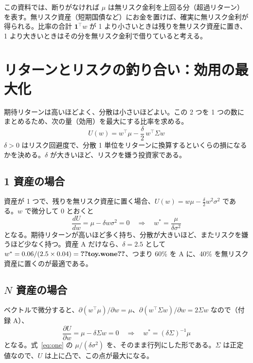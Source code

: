 \documentclass[xelatex,ja=standard,jafont=hiragino-pron,a4paper,11pt,openany]{bxjsreport}
\makeatletter
\newcommand{\V}[1]{\ifcsname v@#1\endcsname\csname v@#1\endcsname\else\textbf{??#1??}\fi}
\newcommand{\tabin}[1]{\adjustbox{max width=\linewidth}{}}
\newcommand{\T}{^{\top}}
\newcommand{\one}{\mathbf{1}}
\makeatother
\begin{document}
\begin{table}[htbp]
\centering
\caption{2 資産を半分ずつ持つポートフォリオの、相関とリスク。}
\label{tab:toyrho}
\small\tabin{toy_rho}
\end{table}

この資料では、断りがなければ $\mu$ は無リスク金利を上回る分（超過リターン）を表す。無リスク資産（短期国債など）にお金を置けば、確実に無リスク金利が得られる。比率の合計 $\one\T w$ が 1 より小さいときは残りを無リスク資産に置き、1 より大きいときはその分を無リスク金利で借りていると考える。

\section{リターンとリスクの釣り合い：効用の最大化}

期待リターンは高いほどよく、分散は小さいほどよい。この 2 つを 1 つの数にまとめるため、次の量（効用）を最大にする比率を求める。
\begin{equation}
U(w) = w\T\mu - \frac{\delta}{2}\, w\T\Sigma w
\label{eq:utility}
\end{equation}
$\delta > 0$ はリスク回避度で、分散 1 単位をリターンに換算するといくらの損になるかを決める。$\delta$ が大きいほど、リスクを嫌う投資家である。

\subsection{1 資産の場合}

資産が 1 つで、残りを無リスク資産に置く場合、$U(w) = w\mu - \frac{\delta}{2} w^2\sigma^2$ である。$w$ で微分して 0 とおくと
\begin{equation}
\frac{dU}{dw} = \mu - \delta w \sigma^2 = 0
\quad\Longrightarrow\quad
w^* = \frac{\mu}{\delta\sigma^2}
\label{eq:one}
\end{equation}
となる。期待リターンが高いほど多く持ち、分散が大きいほど、またリスクを嫌うほど少なく持つ。資産 A だけなら、$\delta = 2.5$ として $w^* = 0.06 / (2.5 \times 0.04) = \V{toy.wone}$、つまり 60\% を A に、40\% を無リスク資産に置くのが最適である。

\subsection{$N$ 資産の場合}

ベクトルで微分すると、$\partial(w\T\mu)/\partial w = \mu$、$\partial(w\T\Sigma w)/\partial w = 2\Sigma w$ なので（付録 A）、
\begin{equation}
\frac{\partial U}{\partial w} = \mu - \delta\Sigma w = 0
\quad\Longrightarrow\quad
w^* = (\delta\Sigma)^{-1}\mu
\label{eq:mvfree}
\end{equation}
となる。式~\eqref{eq:one} の $\mu/(\delta\sigma^2)$ を、そのまま行列にした形である。$\Sigma$ は正定値なので、$U$ は上に凸で、この点が最大になる。
\end{document}

